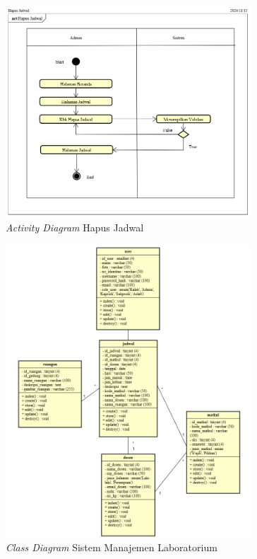 \begin{figure}
	\centering
	\includegraphics[width=0.82\textwidth]{konten/gambar/activity-diagram/hapus-jadwal.png}
	\caption{\textit{Activity Diagram} Hapus Jadwal}
	\label{activity-diagram-hapus-jadwal}
\end{figure}

\begin{figure}
	\centering
	\includegraphics[width=0.82\textwidth]{konten/gambar/class-diagram.png}
	\caption{\textit{Class Diagram} Sistem Manajemen Laboratorium}
	\label{class-diagram}
\end{figure}

